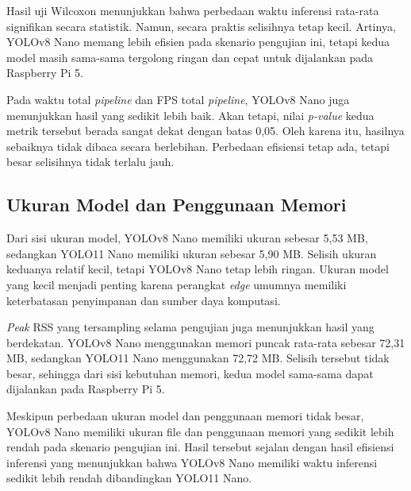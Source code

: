 \begin{sectioncontent}
\begin{subsectioncontent}
        Hasil uji Wilcoxon menunjukkan bahwa perbedaan waktu inferensi rata-rata signifikan secara statistik. Namun, secara praktis selisihnya tetap kecil. Artinya, YOLOv8 Nano memang lebih efisien pada skenario pengujian ini, tetapi kedua model masih sama-sama tergolong ringan dan cepat untuk dijalankan pada Raspberry Pi 5.

        Pada waktu total \textit{pipeline} dan FPS total \textit{pipeline}, YOLOv8 Nano juga menunjukkan hasil yang sedikit lebih baik. Akan tetapi, nilai \textit{p-value} kedua metrik tersebut berada sangat dekat dengan batas 0,05. Oleh karena itu, hasilnya sebaiknya tidak dibaca secara berlebihan. Perbedaan efisiensi tetap ada, tetapi besar selisihnya tidak terlalu jauh.
    \end{subsectioncontent}

    \subsection{Ukuran Model dan Penggunaan Memori}
    \begin{subsectioncontent}
        \hspace{\parindent}Dari sisi ukuran model, YOLOv8 Nano memiliki ukuran sebesar 5,53 MB, sedangkan YOLO11 Nano memiliki ukuran sebesar 5,90 MB. Selisih ukuran keduanya relatif kecil, tetapi YOLOv8 Nano tetap lebih ringan. Ukuran model yang kecil menjadi penting karena perangkat \textit{edge} umumnya memiliki keterbatasan penyimpanan dan sumber daya komputasi.

        \textit{Peak} RSS yang tersampling selama pengujian juga menunjukkan hasil yang berdekatan. YOLOv8 Nano menggunakan memori puncak rata-rata sebesar 72,31 MB, sedangkan YOLO11 Nano menggunakan 72,72 MB. Selisih tersebut tidak besar, sehingga dari sisi kebutuhan memori, kedua model sama-sama dapat dijalankan pada Raspberry Pi 5.

        Meskipun perbedaan ukuran model dan penggunaan memori tidak besar, YOLOv8 Nano memiliki ukuran file dan penggunaan memori yang sedikit lebih rendah pada skenario pengujian ini. Hasil tersebut sejalan dengan hasil efisiensi inferensi yang menunjukkan bahwa YOLOv8 Nano memiliki waktu inferensi sedikit lebih rendah dibandingkan YOLO11 Nano.
    \end{subsectioncontent}


\end{sectioncontent}
